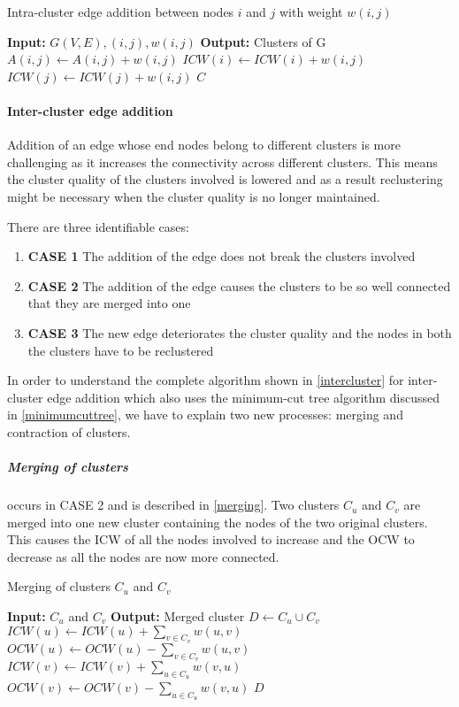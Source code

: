 \begin{algorithm}
\caption{Intra-cluster edge addition between nodes $i$ and $j$ with weight $w(i,j)$}
\label{intracluster}
\begin{algorithmic}
\STATE \textbf{Input:} $G(V,E), (i,j), w(i,j)$ 
\STATE \textbf{Output:} Clusters of G
\STATE $A(i,j) \leftarrow A(i,j) + w(i,j)$
\STATE $ICW(i) \leftarrow ICW(i) + w(i,j)$
\STATE $ICW(j) \leftarrow ICW(j) + w(i,j)$
\RETURN $C$
\end{algorithmic}
\end{algorithm}

\paragraph{Inter-cluster edge addition}

Addition of an edge whose end nodes belong to different clusters is more challenging as it increases the connectivity across different clusters. This means the cluster quality of the clusters involved is lowered and as a result reclustering might be necessary when the cluster quality is no longer maintained. 

There are three identifiable cases:

\begin{enumerate}
	\item \textbf{CASE 1} The addition of the edge does not break the clusters involved
	\item \textbf{CASE 2} The addition of the edge causes the clusters to be so well connected that they are merged into one
	\item \textbf{CASE 3} The new edge deteriorates the cluster quality and the nodes in both the clusters have to be reclustered
\end{enumerate}

In order to understand the complete algorithm shown in \ref{intercluster} for inter-cluster edge addition which also uses the minimum-cut tree algorithm discussed in \ref{minimumcuttree}, we have to explain two new processes: merging and contraction of clusters.

\subparagraph{Merging of clusters} occurs in CASE 2 and is described in \ref{merging}. Two clusters $C_u$ and $C_v$ are merged into one new cluster containing the nodes of the two original clusters. This causes the ICW of all the nodes involved to increase and the OCW to decrease as all the nodes are now more connected.

\begin{algorithm}
\caption{Merging of clusters $C_u$ and $C_v$}
\label{merging}
\begin{algorithmic}
\STATE \textbf{Input:} $C_u$ and $C_v$ 
\STATE \textbf{Output:} Merged cluster
\STATE $D \leftarrow C_u \cup C_v$
	\STATE $ICW(u) \leftarrow ICW(u) + \sum_{v \in C_v}{w(u,v)}$
	\STATE $OCW(u) \leftarrow OCW(u) - \sum_{v \in C_v}{w(u,v)}$
\ENDFOR
{}
	\STATE $ICW(v) \leftarrow ICW(v) + \sum_{u \in C_u}{w(v,u)}$
	\STATE $OCW(v) \leftarrow OCW(v) - \sum_{u \in C_u}{w(v,u)}$
\ENDFOR
\RETURN $D$
\end{algorithmic}
\end{algorithm}

